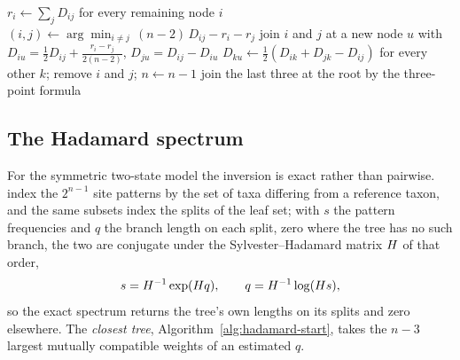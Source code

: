 \documentclass[11pt,a4paper]{article}
\begin{document}
\begin{algorithm}[htbp]
\caption{Neighbor joining on a distance matrix $D$ over $n$ taxa}
\label{alg:neighbor-joining}
\begin{algorithmic}[1]
  \State $r_i \gets \sum_j D_{ij}$ for every remaining node $i$
  \State $(i, j) \gets \arg\min_{i \neq j}\, (n-2)\,D_{ij} - r_i - r_j$
  \State join $i$ and $j$ at a new node $u$ with
    $D_{iu} = \tfrac12 D_{ij} + \tfrac{r_i - r_j}{2(n-2)}$,\;
    $D_{ju} = D_{ij} - D_{iu}$
  \State $D_{ku} \gets \tfrac12 (D_{ik} + D_{jk} - D_{ij})$ for every other $k$;
    remove $i$ and $j$; $n \gets n - 1$
\EndWhile
\State join the last three at the root by the three-point formula
\end{algorithmic}
\end{algorithm}

\subsection{The Hadamard spectrum}
\label{sec:phylo:hadamard}
For the symmetric two-state model the inversion is exact rather than
pairwise. \citet{hendy1993} index the $2^{n-1}$ site patterns by the set of
taxa differing from a reference taxon, and the same subsets index the splits
of the leaf set; with $s$ the pattern frequencies and $q$ the branch length on
each split, zero where the tree has no such branch, the two are conjugate
under the Sylvester--Hadamard matrix $H$ of that order,
\begin{equation}
  s = H^{-1} \exp(H q), \qquad q = H^{-1} \log(H s),
  \label{eq:hadamard}
\end{equation}
so the exact spectrum returns the tree's own lengths on its splits and zero
elsewhere. The \emph{closest tree}, Algorithm~\ref{alg:hadamard-start}, takes
the $n-3$ largest mutually compatible weights of an estimated $q$.
\end{document}
